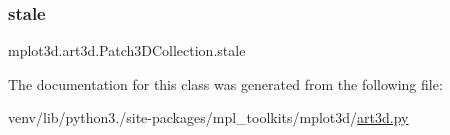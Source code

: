 \subsubsection{\texorpdfstring{stale}{stale}}
{\footnotesize\ttfamily mplot3d.\+art3d.\+Patch3\+D\+Collection.\+stale}



The documentation for this class was generated from the following file\+:\begin{DoxyCompactItemize}
\item 
venv/lib/python3./site-\/packages/mpl\+\_\+toolkits/mplot3d/\hyperlink{art3d_8py}{art3d.\+py}\end{DoxyCompactItemize}

